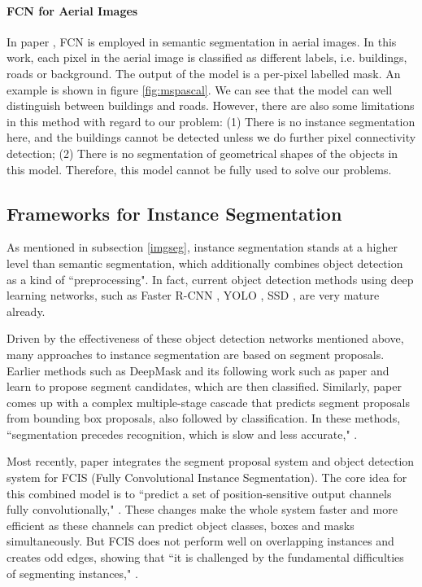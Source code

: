 

\paragraph{FCN for Aerial Images} In paper \cite{mspascal}, FCN is employed in semantic segmentation in aerial images. In this work, each pixel in the aerial image is classified as different labels, i.e. buildings, roads or background. The output of the model is a per-pixel labelled mask. An example is shown in figure \ref{fig:mspascal}. We can see that the model can well distinguish between buildings and roads. However, there are also some limitations in this method with regard to our problem: (1) There is no instance segmentation here, and the buildings cannot be detected unless we do further pixel connectivity detection; (2) There is no segmentation of geometrical shapes of the objects in this model. Therefore, this model cannot be fully used to solve our problems.

\subsection{Frameworks for Instance Segmentation}\label{dlistseg}
As mentioned in subsection \ref{imgseg}, instance segmentation stands at a higher level than semantic segmentation, which additionally combines object detection as a kind of ``preprocessing". In fact, current object detection methods using deep learning networks, such as Faster R-CNN \cite{fasterrcnn}, YOLO \cite{yolo}, SSD \cite{ssd}, are very mature already.

Driven by the effectiveness of these object detection networks mentioned above, many approaches to instance segmentation are based on segment proposals. Earlier methods such as DeepMask \cite{deepmask} and its following work such as paper \cite{pedroinsseg} and \cite{daiinsseg1} learn to propose segment candidates, which are then classified. Similarly, paper \cite{daiinsseg} comes up with a complex multiple-stage cascade that predicts segment proposals from bounding box proposals, also followed by classification. In these methods, ``segmentation precedes recognition, which is slow and less accurate," \cite{maskrcnn}.

Most recently, paper \cite{liinsseg} integrates the segment proposal system and object detection system for FCIS (Fully Convolutional Instance Segmentation). The core idea for this combined model is to ``predict a set of position-sensitive output channels fully convolutionally," \cite{maskrcnn}. These changes make the whole system faster and more efficient as these channels can predict object classes, boxes and masks simultaneously. But FCIS does not perform well on overlapping instances and creates odd edges, showing that ``it is challenged by the fundamental difficulties of segmenting instances," \cite{maskrcnn}.

